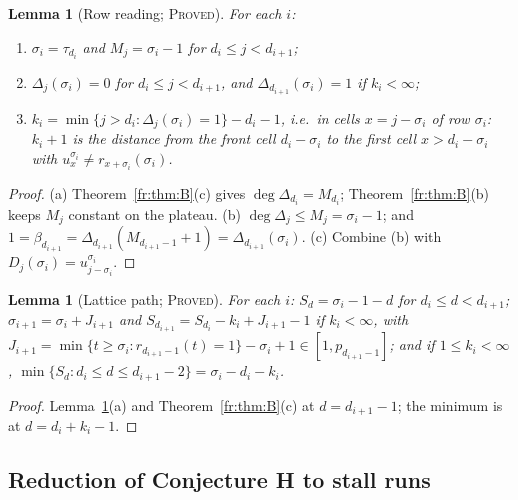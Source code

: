 \documentclass[11pt]{article}
\newtheorem{lemma}[theorem]{Lemma}
\theoremstyle{definition}
\theoremstyle{remark}
\newcommand{\PROVED}{\textsc{Proved}}
\begin{document}
\begin{lemma}[Row reading; \PROVED]\label{fr:lem:row}
For each $i$:
\begin{enumerate}
\item[(a)] $\sigma_i=\tau_{d_i}$ and $M_j=\sigma_i-1$ for $d_i\le j<d_{i+1}$;
\item[(b)] $\Delta_j(\sigma_i)=0$ for $d_i\le j<d_{i+1}$, and $\Delta_{d_{i+1}}(\sigma_i)=1$ if $k_i<\infty$;
\item[(c)] $k_i=\min\{j>d_i:\Delta_j(\sigma_i)=1\}-d_i-1$, i.e.\ in cells $x=j-\sigma_i$ of row $\sigma_i$:
$k_i+1$ is the distance from the front cell $d_i-\sigma_i$ to the first cell $x>d_i-\sigma_i$ with
$u^{\sigma_i}_x\ne r_{x+\sigma_i}(\sigma_i)$.
\end{enumerate}
\end{lemma}
\begin{proof}
(a) Theorem~\ref{fr:thm:B}(c) gives $\deg\Delta_{d_i}=M_{d_i}$; Theorem~\ref{fr:thm:B}(b) keeps
$M_j$ constant on the plateau. (b) $\deg\Delta_j\le M_j=\sigma_i-1$; and
$1=\beta_{d_{i+1}}=\Delta_{d_{i+1}}(M_{d_{i+1}-1}+1)=\Delta_{d_{i+1}}(\sigma_i)$.
(c) Combine (b) with $D_j(\sigma_i)=u^{\sigma_i}_{j-\sigma_i}$.
\end{proof}

\begin{lemma}[Lattice path; \PROVED]\label{fr:lem:path}
For each $i$: $S_d=\sigma_i-1-d$ for $d_i\le d<d_{i+1}$;
$\sigma_{i+1}=\sigma_i+J_{i+1}$ and $S_{d_{i+1}}=S_{d_i}-k_i+J_{i+1}-1$ if $k_i<\infty$, with
$J_{i+1}=\min\{t\ge\sigma_i:r_{d_{i+1}-1}(t)=1\}-\sigma_i+1\in[1,p_{d_{i+1}-1}]$;
and if $1\le k_i<\infty$, $\min\{S_d:d_i\le d\le d_{i+1}-2\}=\sigma_i-d_i-k_i$.
\end{lemma}
\begin{proof}
Lemma~\ref{fr:lem:row}(a) and Theorem~\ref{fr:thm:B}(c) at $d=d_{i+1}-1$; the minimum is at
$d=d_i+k_i-1$.
\end{proof}

\subsection{Reduction of Conjecture H to stall runs}
\end{document}
